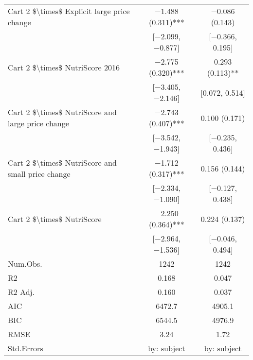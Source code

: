 \begin{table}
\begin{tabular}[t]{lcc}
Cart 2 \$\textbackslash{}times\$ Explicit large price change & \num{-1.488} (\num{0.311})*** & \num{-0.086} (\num{0.143})\\
 & {}[\num{-2.099}, \num{-0.877}] & {}[\num{-0.366}, \num{0.195}]\\
Cart 2 \$\textbackslash{}times\$ NutriScore 2016 & \num{-2.775} (\num{0.320})*** & \num{0.293} (\num{0.113})**\\
 & {}[\num{-3.405}, \num{-2.146}] & {}[\num{0.072}, \num{0.514}]\\
Cart 2 \$\textbackslash{}times\$ NutriScore and large price change & \num{-2.743} (\num{0.407})*** & \num{0.100} (\num{0.171})\\
 & {}[\num{-3.542}, \num{-1.943}] & {}[\num{-0.235}, \num{0.436}]\\
Cart 2 \$\textbackslash{}times\$ NutriScore and small price change & \num{-1.712} (\num{0.317})*** & \num{0.156} (\num{0.144})\\
 & {}[\num{-2.334}, \num{-1.090}] & {}[\num{-0.127}, \num{0.438}]\\
Cart 2 \$\textbackslash{}times\$ NutriScore & \num{-2.250} (\num{0.364})*** & \num{0.224} (\num{0.137})\\
 & {}[\num{-2.964}, \num{-1.536}] & {}[\num{-0.046}, \num{0.494}]\\
\midrule
Num.Obs. & \num{1242} & \num{1242}\\
R2 & \num{0.168} & \num{0.047}\\
R2 Adj. & \num{0.160} & \num{0.037}\\
AIC & \num{6472.7} & \num{4905.1}\\
BIC & \num{6544.5} & \num{4976.9}\\
RMSE & \num{3.24} & \num{1.72}\\
Std.Errors & by: subject & by: subject\\
\bottomrule
\end{tabular}
\end{table}
